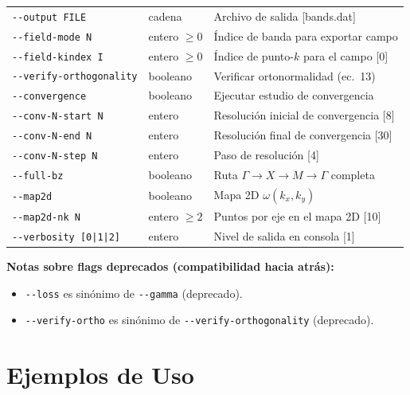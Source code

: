 \documentclass[12pt,a4paper]{article}
\begin{document}
\begin{table}[htbp]
\begin{tabular}{@{}lll@{}}
    \texttt{-{}-output FILE}           & cadena          & Archivo de salida [bands.dat] \\
    \texttt{-{}-field-mode N}          & entero $\geq 0$ & Índice de banda para exportar campo \\
    \texttt{-{}-field-kindex I}        & entero $\geq 0$ & Índice de punto-$k$ para el campo [0] \\
    \texttt{-{}-verify-orthogonality}  & booleano        & Verificar ortonormalidad (ec.\ 13) \\
    \texttt{-{}-convergence}           & booleano        & Ejecutar estudio de convergencia \\
    \texttt{-{}-conv-N-start N}        & entero          & Resolución inicial de convergencia [8] \\
    \texttt{-{}-conv-N-end N}          & entero          & Resolución final de convergencia [30] \\
    \texttt{-{}-conv-N-step N}         & entero          & Paso de resolución [4] \\
    \texttt{-{}-full-bz}               & booleano        & Ruta $\Gamma\to X\to M\to\Gamma$ completa \\
    \texttt{-{}-map2d}                 & booleano        & Mapa 2D $\omega(k_x,k_y)$ \\
    \texttt{-{}-map2d-nk N}            & entero $\geq 2$ & Puntos por eje en el mapa 2D [10] \\
    \texttt{-{}-verbosity [0|1|2]}     & entero          & Nivel de salida en consola [1] \\
    \bottomrule
  \end{tabular}
\end{table}

\noindent
\textbf{Notas sobre flags deprecados (compatibilidad hacia atrás):}
\begin{itemize}
  \item \texttt{-{}-loss} es sinónimo de \texttt{-{}-gamma} (deprecado).
  \item \texttt{-{}-verify-ortho} es sinónimo de \texttt{-{}-verify-orthogonality} (deprecado).
\end{itemize}

\section{Ejemplos de Uso}
\end{document}
